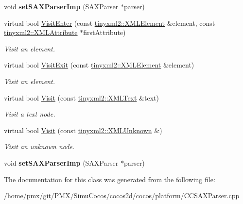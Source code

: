 \begin{DoxyCompactItemize}
\mbox{\label{classXmlSaxHander_a92f49fafd1abb51084643b9800fd8791}} 
void {\bfseries set\+S\+A\+X\+Parser\+Imp} (S\+A\+X\+Parser $\ast$parser)
\item 
\mbox{\label{classXmlSaxHander_a2b0d697c3ca9ed91d611f3a669bd477d}} 
virtual bool \hyperlink{classXmlSaxHander_a2b0d697c3ca9ed91d611f3a669bd477d}{Visit\+Enter} (const \hyperlink{classtinyxml2_1_1XMLElement}{tinyxml2\+::\+X\+M\+L\+Element} \&element, const \hyperlink{classtinyxml2_1_1XMLAttribute}{tinyxml2\+::\+X\+M\+L\+Attribute} $\ast$first\+Attribute)
\begin{DoxyCompactList}\small\item\em Visit an element. \end{DoxyCompactList}\item 
\mbox{\label{classXmlSaxHander_ad09dfff3cd609f7a75a4f06f1a1d7478}} 
virtual bool \hyperlink{classXmlSaxHander_ad09dfff3cd609f7a75a4f06f1a1d7478}{Visit\+Exit} (const \hyperlink{classtinyxml2_1_1XMLElement}{tinyxml2\+::\+X\+M\+L\+Element} \&element)
\begin{DoxyCompactList}\small\item\em Visit an element. \end{DoxyCompactList}\item 
\mbox{\label{classXmlSaxHander_addc29219400bb31d7bb6bff38b4789b8}} 
virtual bool \hyperlink{classXmlSaxHander_addc29219400bb31d7bb6bff38b4789b8}{Visit} (const \hyperlink{classtinyxml2_1_1XMLText}{tinyxml2\+::\+X\+M\+L\+Text} \&text)
\begin{DoxyCompactList}\small\item\em Visit a text node. \end{DoxyCompactList}\item 
\mbox{\label{classXmlSaxHander_a33ff44d4e7c86a5acfb5fbd80f2eee4c}} 
virtual bool \hyperlink{classXmlSaxHander_a33ff44d4e7c86a5acfb5fbd80f2eee4c}{Visit} (const \hyperlink{classtinyxml2_1_1XMLUnknown}{tinyxml2\+::\+X\+M\+L\+Unknown} \&)
\begin{DoxyCompactList}\small\item\em Visit an unknown node. \end{DoxyCompactList}\item 
\mbox{\label{classXmlSaxHander_a92f49fafd1abb51084643b9800fd8791}} 
void {\bfseries set\+S\+A\+X\+Parser\+Imp} (S\+A\+X\+Parser $\ast$parser)
\end{DoxyCompactItemize}


The documentation for this class was generated from the following file\+:\begin{DoxyCompactItemize}
\item 
/home/pmx/git/\+P\+M\+X/\+Simu\+Cocos/cocos2d/cocos/platform/C\+C\+S\+A\+X\+Parser.\+cpp\end{DoxyCompactItemize}
